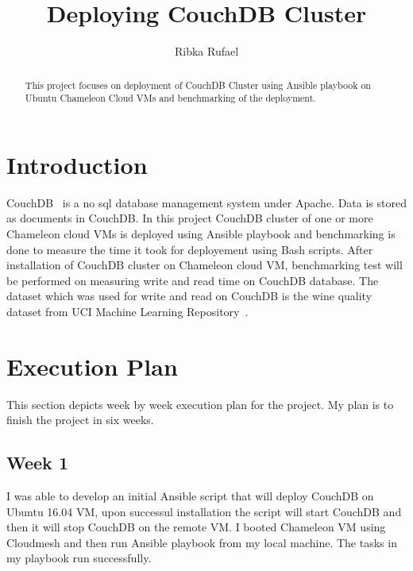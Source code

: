 \title{Deploying CouchDB Cluster}


\author{Ribka Rufael}
\orcid{}



\renewcommand{\shortauthors}{R. Rufael}


\begin{abstract}
  This project focuses on deployment of CouchDB Cluster using Ansible
  playbook on Ubuntu Chameleon Cloud VMs and benchmarking of the
  deployment.
\end{abstract}



\maketitle

\section{Introduction}

CouchDB~\cite{www-Couchdb} is a no sql database management system
under Apache. Data is stored as documents in CouchDB. In this project
CouchDB cluster of one or more Chameleon cloud VMs is deployed using
Ansible playbook and benchmarking is done to measure the time it took
for deployement using Bash scripts. After installation of CouchDB
cluster on Chameleon cloud VM, benchmarking test will be performed on
measuring write and read time on CouchDB database. The dataset which
was used for write and read on CouchDB is the wine quality dataset
from UCI Machine Learning Repository~\cite{www-WineQuality}.

\section{Execution Plan}

This section depicts week by week execution plan for the project. My
plan is to finish the project in six weeks.

\subsection{Week 1}

I was able to develop an initial Ansible script that will deploy
CouchDB on Ubuntu 16.04 VM, upon successul installation the script
will start CouchDB and then it will stop CouchDB on the remote VM. I
booted Chameleon VM using Cloudmesh and then run Ansible playbook from
my local machine. The tasks in my playbook run successfully.


